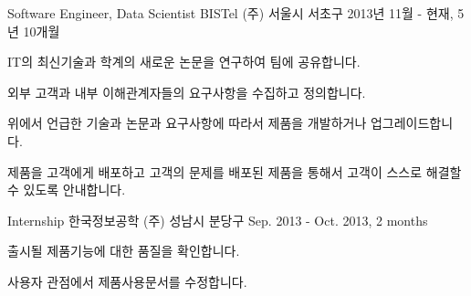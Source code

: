 

\begin{cventries}

  \cventry
    {Software Engineer, Data Scientist} %
    {BISTel (주)} %
    {서울시 서초구} %
    {2013년 11월 - 현재, 5년 10개월} %
    {
      \begin{cvitems} %
        \item {IT의 최신기술과 학계의 새로운 논문을 연구하여 팀에 공유합니다.}
        \item {외부 고객과 내부 이해관계자들의 요구사항을 수집하고 정의합니다.}
        \item {위에서 언급한 기술과 논문과 요구사항에 따라서 제품을 개발하거나 업그레이드합니다.}
        \item {제품을 고객에게 배포하고 고객의 문제를 배포된 제품을 통해서 고객이 스스로 해결할 수 있도록 안내합니다.}
      \end{cvitems}
    }

  \cventry
    {Internship} %
    {한국정보공학 (주)} %
    {성남시 분당구} %
    {Sep. 2013 - Oct. 2013, 2 months} %
    {
      \begin{cvitems} %
        \item {출시될 제품기능에 대한 품질을 확인합니다.}
        \item {사용자 관점에서 제품사용문서를 수정합니다.}
      \end{cvitems}
    }

\end{cventries}
